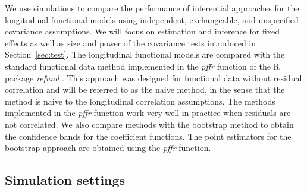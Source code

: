 \documentclass[submit]{smj}
\begin{document}
We use simulations to compare the performance of inferential approaches for the longitudinal functional models using independent, exchangeable, and unspecified covariance assumptions. We will focus on estimation and inference for fixed effects as well as size and power of the covariance tests introduced in Section~\ref{sec:test}. The longitudinal functional models are compared with the standard functional data method implemented  in the {\it pffr} function \citep{Ivanescu2015, Scheipl2015, Scheipl2016} of the R package {\it refund} \citep{refund2018}. This approach was designed for functional data without residual correlation and will be referred to as the naive method, in the sense that the method is naive to the longitudinal correlation assumptions. The methods implemented in the {\it pffr} function work very well in practice when residuals are not correlated. We also compare methods with the  bootstrap method  \citep{ Park2018} to obtain the confidence bands for the coefficient functions. The point estimators for the bootstrap approach are obtained using the {\it pffr} function.


\subsection{Simulation settings}\label{subsec:sim_scenarios}
\end{document}
